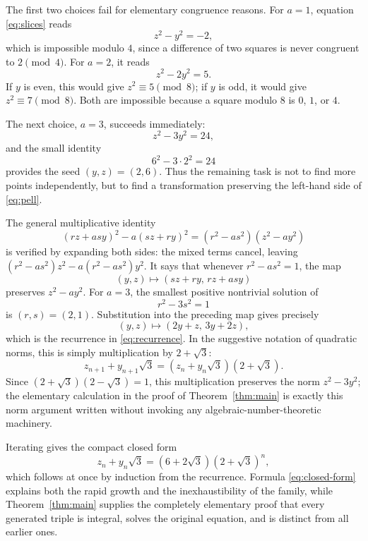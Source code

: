 \documentclass[10pt]{article}
\begin{document}
The first two choices fail for elementary congruence reasons.  For $a=1$, equation \eqref{eq:slices} reads
\[
 z^2-y^2=-2,
\]
which is impossible modulo $4$, since a difference of two squares is never congruent to $2\pmod4$.  For $a=2$, it reads
\[
 z^2-2y^2=5.
\]
If $y$ is even, this would give $z^2\equiv5\pmod8$; if $y$ is odd, it would give $z^2\equiv7\pmod8$.  Both are impossible because a square modulo $8$ is $0$, $1$, or $4$.

The next choice, $a=3$, succeeds immediately:
\begin{equation}\label{eq:pell}
 z^2-3y^2=24,
\end{equation}
and the small identity
\[
 6^2-3\cdot2^2=24
\]
provides the seed $(y,z)=(2,6)$.  Thus the remaining task is not to find more points independently, but to find a transformation preserving the left-hand side of \eqref{eq:pell}.

The general multiplicative identity
\begin{equation}\label{eq:norm-identity}
 (rz+asy)^2-a(sz+ry)^2
 =(r^2-as^2)(z^2-ay^2)
\end{equation}
is verified by expanding both sides: the mixed terms cancel, leaving
\((r^2-as^2)z^2-a(r^2-as^2)y^2\).  It says that whenever
$r^2-as^2=1$, the map
\[
 (y,z)\longmapsto (sz+ry,\,rz+asy)
\]
preserves $z^2-ay^2$.  For $a=3$, the smallest positive nontrivial solution of
\[
 r^2-3s^2=1
\]
is $(r,s)=(2,1)$.  Substitution into the preceding map gives precisely
\[
 (y,z)\longmapsto(2y+z,\,3y+2z),
\]
which is the recurrence in \eqref{eq:recurrence}.  In the suggestive notation of quadratic norms, this is simply multiplication by $2+\sqrt3$:
\[
 z_{n+1}+y_{n+1}\sqrt3
 =(z_n+y_n\sqrt3)(2+\sqrt3).
\]
Since $(2+\sqrt3)(2-\sqrt3)=1$, this multiplication preserves the norm
$z^2-3y^2$; the elementary calculation in the proof of Theorem~\ref{thm:main} is exactly this norm argument written without invoking any algebraic-number-theoretic machinery.

Iterating gives the compact closed form
\begin{equation}\label{eq:closed-form}
 z_n+y_n\sqrt3=(6+2\sqrt3)(2+\sqrt3)^n,
\end{equation}
which follows at once by induction from the recurrence.  Formula \eqref{eq:closed-form} explains both the rapid growth and the inexhaustibility of the family, while Theorem~\ref{thm:main} supplies the completely elementary proof that every generated triple is integral, solves the original equation, and is distinct from all earlier ones.
\end{document}

